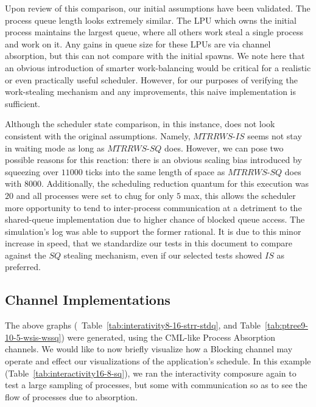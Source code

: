 Upon review of this comparison, our initial assumptions have been validated. The process queue
length looks extremely similar. The LPU which owns the initial process maintains the 
largest queue, where all others work steal a single process and work on it. Any gains in
queue size for these LPUs are via channel absorption, but this can not compare with the
initial spawns. We note here that an obvious introduction of smarter work-balancing
would be critical for a realistic or even practically useful scheduler. However, for our
purposes of verifying the work-stealing mechanism and any improvements, this naive implementation is sufficient.

Although the scheduler state comparison, in this instance, does not look consistent with 
the original assumptions. Namely, $MTRRWS$-$IS$ seems not stay in waiting mode as long
as $MTRRWS$-$SQ$ does. However, we can pose two possible reasons for this reaction:
there is an obvious scaling bias introduced by squeezing over $11000$ ticks into the same length
of space as $MTRRWS$-$SQ$ does with $8000$. Additionally, the scheduling reduction quantum for 
this execution was $20$ and all processes were set to chug for only $5$ max, this allows the 
scheduler more opportunity to tend to inter-process communication at a detriment to
the shared-queue implementation due to higher chance of blocked queue access.
The simulation's log was able to support the former rational. It is due to this 
minor increase in speed, that we standardize our tests in this document to 
compare against the $SQ$ stealing mechanism, even if our selected tests showed 
$IS$ as preferred.

\subsection{Channel Implementations}\label{sec:results-channel-implementations}

The above graphs (\eg~Table~\ref{tab:interativity8-16-strr-stdq}, and 
Table~\ref{tab:ptree9-10-5-wsis-wssq}) were generated, using the CML-like Process 
Absorption channels. We would like to now briefly visualize how a Blocking channel
may operate and effect our visualizations of the application's schedule. In this example 
(Table~\ref{tab:interactivity16-8-sq}), we ran the interactivity composure again
to test a large sampling of processes, but some with communication so as to see the 
flow of processes due to absorption.

